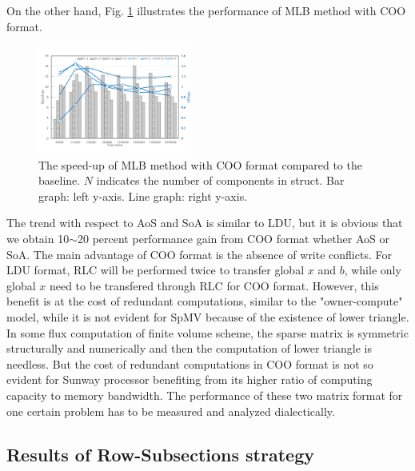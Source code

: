 \documentclass[5p,times]{elsarticle}
\begin{document}
On the other hand, Fig. \ref{mlbcsr} illustrates the performance of MLB method with COO format.
\begin{figure}[tbp]
\centerline{\includegraphics[width=0.45\textwidth]{mlb(csr)-1.png}}
\caption{The speed-up of MLB method with COO format compared to the baseline. $N$ indicates the number of components in struct. Bar graph: left y-axis. Line graph: right y-axis.}
\label{mlbcsr}
\end{figure}
The trend with respect to AoS and SoA is similar to LDU, but it is obvious that we obtain 10$\sim$20 percent performance gain from COO format whether AoS or SoA. The main advantage of COO format is the absence of write conflicts. For LDU format, RLC will be performed twice to transfer global $x$ and $b$, while only global $x$ need to be transfered through RLC for COO format. However, this benefit is at the cost of redundant computations, similar to the "owner-compute" model\cite{b2}, while it is not evident for SpMV because of the existence of lower triangle. In some flux computation of finite volume scheme, the sparse matrix is symmetric structurally and numerically and then the computation of lower triangle is needless. But the cost of redundant computations in COO format is not so evident for Sunway processor benefiting from its higher ratio of computing capacity to memory bandwidth. The performance of these two matrix format for one certain problem has to be measured and analyzed dialectically.

\subsection{Results of Row-Subsections strategy}
\end{document}
